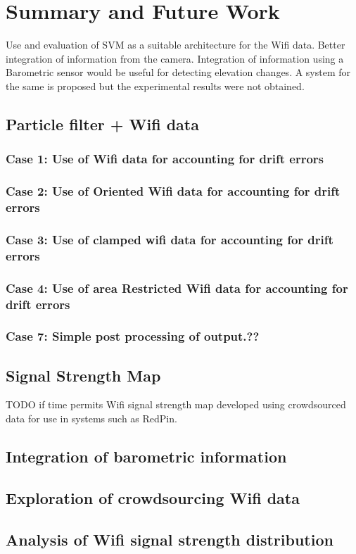 \chapter{Summary and Future Work}
Use and evaluation of SVM as a suitable architecture for the Wifi data.
Better integration of information from the camera.
Integration of information using a Barometric sensor would be useful for detecting elevation changes. A system for the same is proposed but the experimental results were not obtained. 


\section{Particle filter + Wifi data}

\subsection{Case 1: Use of Wifi data for accounting for drift errors}
\subsection{Case 2: Use of Oriented Wifi data for accounting for drift errors}
\subsection{Case 3: Use of clamped wifi data for accounting for drift errors}
\subsection{Case 4: Use of area Restricted Wifi data for accounting for drift errors}
\subsection{Case 7: Simple post processing of output.??}

\section{Signal Strength Map}

TODO if time permits
Wifi signal strength map developed using crowdsourced data for use in systems such as RedPin.


\section{Integration of barometric information}

\section{Exploration of crowdsourcing Wifi data}

\section{Analysis of Wifi signal strength distribution}


